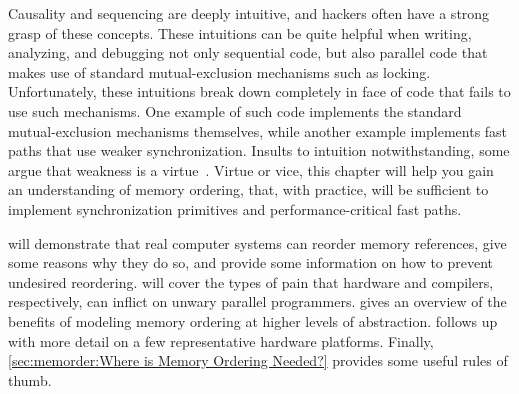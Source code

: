 
%

Causality and sequencing are deeply intuitive, and hackers often
have a strong grasp of these concepts.
These intuitions can be quite helpful when writing, analyzing, and
debugging not only sequential code, but also parallel code that makes
use of standard mutual-exclusion mechanisms such as locking.
Unfortunately, these intuitions break down completely in face of
code that fails to use such mechanisms.
One example of such code implements the standard mutual-exclusion
mechanisms themselves, while another example implements fast
paths that use weaker synchronization.
Insults to intuition notwithstanding, some argue that weakness is a
virtue~\cite{JadeAlglave2013-WeaknessIsVirtue}.
Virtue or vice, this chapter will help you gain an understanding of
memory ordering, that, with practice, will be sufficient to implement
synchronization primitives and performance-critical fast paths.

will demonstrate that real computer systems can reorder memory references,
give some reasons why they do so, and provide some information on how
to prevent undesired reordering.
will cover the types of pain that hardware and compilers, respectively,
can inflict on unwary parallel programmers.
gives an overview of the benefits of modeling memory ordering at
higher levels of abstraction.
follows up with more detail on a few representative hardware platforms.
Finally, \cref{sec:memorder:Where is Memory Ordering Needed?}
provides some useful rules of thumb.

